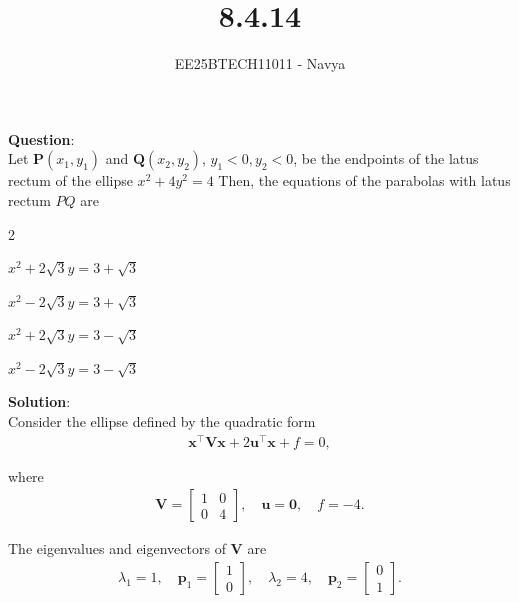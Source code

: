 \documentclass[journal]{IEEEtran}
\begin{document}

\vspace{3cm}

\title{8.4.14}
\author{EE25BTECH11011 - Navya}
{\let\newpage\relax\maketitle}

\renewcommand{\thefigure}{\theenumi}
\renewcommand{\thetable}{\theenumi}
\setlength{\intextsep}{10pt} %
\textbf{Question}:\\

Let $\mathbf{P}(x_1, y_1) $ and $\mathbf{Q}(x_2, y_2)$, $ y_1 < 0, y_2 < 0 $, be the endpoints of the latus rectum of the ellipse $x^2 + 4y^2 = 4$
Then, the equations of the parabolas with latus rectum $PQ$ are
\begin{enumerate}
\begin{multicols}{2}

    \item $ x^2 + 2\sqrt{3}y = 3 + \sqrt{3} $
    \item $ x^2 - 2\sqrt{3}y = 3 + \sqrt{3} $
    \item $ x^2 + 2\sqrt{3}y = 3 - \sqrt{3} $
    \item $ x^2 - 2\sqrt{3}y = 3 - \sqrt{3} $
\end{multicols}
\end{enumerate}


\textbf{Solution}:\\
Consider the ellipse defined by the quadratic form
\begin{align}
\mathbf{x}^\top \mathbf{V} \mathbf{x} + 2 \mathbf{u}^\top \mathbf{x} + f = 0,
\end{align}

where
\begin{align}
\mathbf{V} = \begin{bmatrix} 1 & 0 \\ 0 & 4 \end{bmatrix}, \quad
\mathbf{u} = \mathbf{0}, \quad
f = -4.
\end{align}

The eigenvalues and eigenvectors of $\mathbf{V}$ are
\begin{align}
\lambda_1 = 1, \quad \mathbf{p}_1 = \begin{bmatrix} 1 \\ 0 \end{bmatrix}, \quad
\lambda_2 = 4, \quad \mathbf{p}_2 = \begin{bmatrix} 0 \\ 1 \end{bmatrix}.
\end{align}
\end{document}
